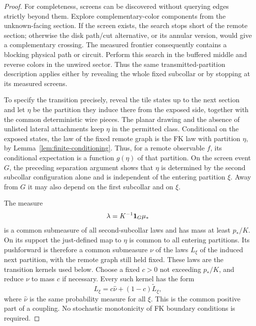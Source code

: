 \begin{proof}
For completeness, screens can be discovered without querying edges
strictly beyond them. Explore complementary-color components from
the unknown-facing section. If the screen exists, the search stops
short of the remote section; otherwise the disk path/cut alternative,
or its annular version, would give a complementary crossing. The
measured frontier consequently contains a blocking physical path or
circuit. Perform this search in the buffered middle and reverse
colors in the unwired sector. Thus the same transmitted-partition
description applies either by revealing the whole fixed subcollar
or by stopping at its measured screens.

To specify the transition precisely, reveal the tile states up to the
next section and let $\eta$ be the partition they induce there from
the exposed side, together with the common deterministic wire pieces.
The planar drawing and the absence of unlisted lateral attachments
keep $\eta$ in the permitted class. Conditional on the exposed states,
the law of the fixed remote graph is the FK law with partition $\eta$,
by Lemma~\ref{lem:finite-conditioning}. Thus, for a remote observable
$f$, its conditional expectation is a function $g(\eta)$ of that
partition. On the screen event $G$, the preceding separation argument
shows that $\eta$ is determined by the second subcollar configuration
alone and is independent of the entering partition $\xi$. Away from
$G$ it may also depend on the first subcollar and on $\xi$.

The measure
\[
        \lambda=K^{-1}\mathbf 1_G\mu_*
\]
is a common submeasure of all second-subcollar laws and has mass at
least $p_*/K$. On its support the just-defined map to $\eta$ is common
to all entering partitions. Its pushforward is therefore a common
submeasure $\nu$ of the laws $L_\xi$ of the induced next partition,
with the remote graph still held fixed. These laws are the transition
kernels used below. Choose a fixed $c>0$ not exceeding
$p_*/K$, and reduce $\nu$ to mass $c$ if necessary. Every such
kernel has the form
\begin{equation}\label{disk:collar-minorization}
       L_\xi=c\widehat\nu+(1-c)\widetilde L_\xi,
\end{equation}
where $\widehat\nu$ is the same probability measure for all
$\xi$. This is the common positive part of a coupling. No
stochastic monotonicity of FK boundary conditions is required.


\end{proof}

